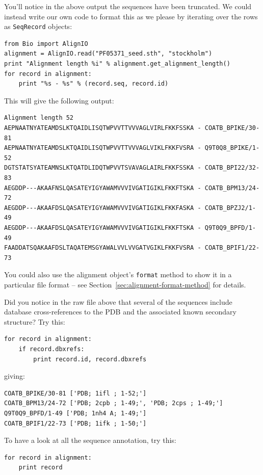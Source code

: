 \documentclass{report}
\begin{document}
You'll notice in the above output the sequences have been truncated.  We could instead write our own code to format this as we please by iterating over the rows as \verb|SeqRecord| objects:

\begin{verbatim}
from Bio import AlignIO
alignment = AlignIO.read("PF05371_seed.sth", "stockholm")
print "Alignment length %i" % alignment.get_alignment_length()
for record in alignment:
    print "%s - %s" % (record.seq, record.id)
\end{verbatim}

\noindent This will give the following output:

\begin{verbatim}
Alignment length 52
AEPNAATNYATEAMDSLKTQAIDLISQTWPVVTTVVVAGLVIRLFKKFSSKA - COATB_BPIKE/30-81
AEPNAATNYATEAMDSLKTQAIDLISQTWPVVTTVVVAGLVIKLFKKFVSRA - Q9T0Q8_BPIKE/1-52
DGTSTATSYATEAMNSLKTQATDLIDQTWPVVTSVAVAGLAIRLFKKFSSKA - COATB_BPI22/32-83
AEGDDP---AKAAFNSLQASATEYIGYAWAMVVVIVGATIGIKLFKKFTSKA - COATB_BPM13/24-72
AEGDDP---AKAAFDSLQASATEYIGYAWAMVVVIVGATIGIKLFKKFASKA - COATB_BPZJ2/1-49
AEGDDP---AKAAFDSLQASATEYIGYAWAMVVVIVGATIGIKLFKKFTSKA - Q9T0Q9_BPFD/1-49
FAADDATSQAKAAFDSLTAQATEMSGYAWALVVLVVGATVGIKLFKKFVSRA - COATB_BPIF1/22-73
\end{verbatim}

You could also use the alignment object's \verb|format| method to show it in a particular file format  -- see Section~\ref{sec:alignment-format-method} for details.

Did you notice in the raw file above that several of the sequences include database cross-references to the PDB and the associated known secondary structure?  Try this:

\begin{verbatim}
for record in alignment:
    if record.dbxrefs:
        print record.id, record.dbxrefs
\end{verbatim}

\noindent giving:

\begin{verbatim}
COATB_BPIKE/30-81 ['PDB; 1ifl ; 1-52;']
COATB_BPM13/24-72 ['PDB; 2cpb ; 1-49;', 'PDB; 2cps ; 1-49;']
Q9T0Q9_BPFD/1-49 ['PDB; 1nh4 A; 1-49;']
COATB_BPIF1/22-73 ['PDB; 1ifk ; 1-50;']
\end{verbatim}

\noindent To have a look at all the sequence annotation, try this:

\begin{verbatim}
for record in alignment:
    print record
\end{verbatim}
\end{document}
